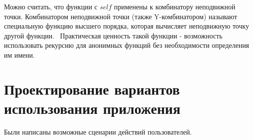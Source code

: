 Можно считать, что функции с $self$ применены к комбинатору неподвижной точки. Комбинатором неподвижной точки (также Y-комбинатором) называют специальную функцию высшего порядка, которая вычисляет неподвижную точку другой функции. 
Практическая ценность такой функции - возможность использовать рекурсию для анонимных функций без необходимости определения им имени.

\FloatBarrier


\section{Проектирование вариантов использования приложения}\label{sec:ch2/sec3}

Были написаны возможные сценарии действий пользователей.


